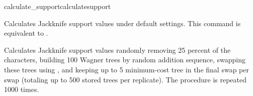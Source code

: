 \begin{command}{calculate\_support}{calculatesupport}
\begin{poyexamples}
            {Calculates Jackknife support values under default settings.  This command
            is equivalent to .}     
            
            {Calculates Jackknife support values randomly removing 25 percent of the
            characters, building 100 Wagner trees by random addition sequence, swapping 
            these trees using , and keeping up to 5 minimum-cost tree in the
            final swap per swap (totaling up to 500 stored trees per replicate). 
            The procedure is repeated 1000 times.}

	\end{poyexamples}
            
	\begin{poyalso}
	\end{poyalso}

\end{command}

   

